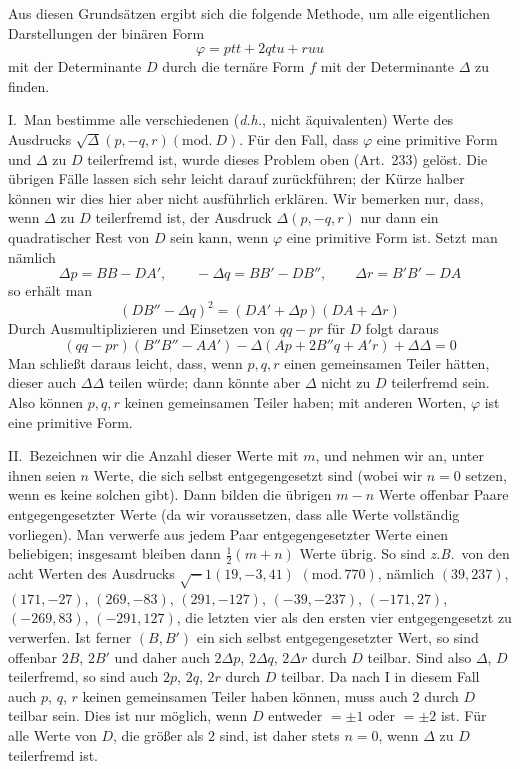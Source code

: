 Aus diesen Grundsätzen ergibt sich die folgende Methode, um alle eigentlichen
Darstellungen der binären Form
\[
\varphi=ptt+2qtu+ruu
\]
mit der Determinante $D$ durch die ternäre Form $f$ mit der
Determinante $\Delta$ zu finden.

I.\ Man bestimme alle verschiedenen (\textit{d.h.}, nicht äquivalenten)
Werte des Ausdrucks $\surd\Delta(p,\allowbreak -q,\allowbreak r)(\mathrm{mod.}\ D)$. Für den Fall, dass $\varphi$ eine primitive Form
und $\Delta$ zu $D$ teilerfremd ist, wurde dieses Problem oben (Art.\ 233)
gelöst. Die übrigen Fälle lassen sich sehr leicht darauf zurückführen;
der Kürze halber können wir dies hier aber nicht ausführlich erklären.
Wir bemerken nur, dass, wenn $\Delta$ zu $D$ teilerfremd ist, der Ausdruck
$\Delta(p,-q,r)$ nur dann ein quadratischer Rest von $D$ sein kann, wenn
$\varphi$ eine primitive Form ist. Setzt man nämlich
\[
\Delta p=BB-DA',\qquad -\Delta q=BB'-DB'',\qquad \Delta r=B'B'-DA
\]
so erhält man
\[
(DB''-\Delta q)^2=(DA'+\Delta p)(DA+\Delta r)
\]
Durch Ausmultiplizieren und Einsetzen von $qq-pr$ für $D$ folgt daraus
\[
(qq-pr)(B''B''-AA')-\Delta(Ap+2B''q+A'r)+\Delta\Delta=0
\]
Man schließt daraus leicht, dass, wenn $p,q,r$ einen gemeinsamen Teiler
hätten, dieser auch $\Delta\Delta$ teilen würde; dann könnte aber $\Delta$ nicht
zu $D$ teilerfremd sein. Also können $p,q,r$ keinen gemeinsamen Teiler
haben; mit anderen Worten, $\varphi$ ist eine primitive Form.

II.\ Bezeichnen wir die Anzahl dieser Werte mit $m$, und nehmen wir
an, unter ihnen seien $n$ Werte, die sich selbst entgegengesetzt sind
(wobei wir $n=0$ setzen, wenn es keine solchen gibt). Dann bilden die
übrigen $m-n$ Werte offenbar Paare entgegengesetzter Werte (da wir
voraussetzen, dass alle Werte vollständig vorliegen). Man verwerfe aus
jedem Paar entgegengesetzter Werte einen beliebigen; insgesamt bleiben
dann $\frac{1}{2}(m+n)$ Werte übrig. So sind \textit{z.B.}\ von den acht Werten des Ausdrucks
$\surd-1(19,-3,41)$
$(\mathrm{mod.}\,770)$, nämlich $(39,237)$, $(171,-27)$, $(269,-83)$, $(291,-127)$, $(-39,-237)$, $(-171,27)$, $(-269,83)$,
$(-291,127)$, die letzten vier als den ersten vier entgegengesetzt zu verwerfen.
Ist ferner $(B,B')$ ein sich selbst entgegengesetzter Wert, so sind offenbar
$2B$, $2B'$ und daher auch $2\Delta p$, $2\Delta q$, $2\Delta r$ durch $D$
teilbar. Sind also $\Delta$, $D$ teilerfremd, so sind auch $2p$,
$2q$, $2r$ durch $D$ teilbar. Da nach I in diesem Fall auch
$p$, $q$, $r$ keinen gemeinsamen Teiler haben können, muss
auch $2$ durch $D$ teilbar sein. Dies ist nur möglich, wenn
$D$ entweder $=\pm1$ oder $=\pm2$ ist. Für alle Werte von $D$,
die größer als $2$ sind, ist daher stets $n=0$, wenn $\Delta$ zu
$D$ teilerfremd ist.

